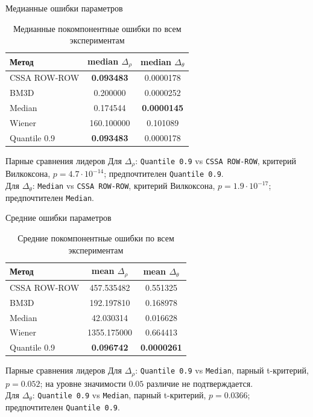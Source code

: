 \documentclass[unicode,notheorems]{beamer}
\begin{document}
\begin{frame}{Медианные ошибки параметров}
	\begin{table}[H]
		\centering
		\scriptsize
		\begin{tabular}{|l|c|c|}
			\hline
			Метод & median $\Delta_\rho$ & median $\Delta_\theta$ \\
			\hline
			CSSA ROW-ROW & \textbf{0.093483} & 0.0000178 \\
			BM3D & 0.200000 & 0.0000252 \\
			Median & 0.174544 & \textbf{0.0000145} \\
			Wiener & 160.100000 & 0.101089 \\
			Quantile 0.9 & \textbf{0.093483} & 0.0000178 \\
			\hline
		\end{tabular}
		\caption{Медианные покомпонентные ошибки по всем экспериментам}
	\end{table}

	\begin{block}{Парные сравнения лидеров}
		\scriptsize
		Для $\Delta_\rho$: \texttt{Quantile 0.9} vs \texttt{CSSA ROW-ROW}, критерий Вилкоксона,
		$p=4.7\cdot 10^{-14}$; предпочтителен \texttt{Quantile 0.9}.\\
		Для $\Delta_\theta$: \texttt{Median} vs \texttt{CSSA ROW-ROW}, критерий Вилкоксона,
		$p=1.9\cdot 10^{-17}$; предпочтителен \texttt{Median}.
	\end{block}
\end{frame}

\begin{frame}{Средние ошибки параметров}
	\begin{table}[H]
		\centering
		\scriptsize
		\begin{tabular}{|l|c|c|}
			\hline
			Метод & mean $\Delta_\rho$ & mean $\Delta_\theta$ \\
			\hline
			CSSA ROW-ROW & 457.535482 & 0.551325 \\
			BM3D & 192.197810 & 0.168978 \\
			Median & 42.030314 & 0.016628 \\
			Wiener & 1355.175000 & 0.664413 \\
			Quantile 0.9 & \textbf{0.096742} & \textbf{0.0000261} \\
			\hline
		\end{tabular}
		\caption{Средние покомпонентные ошибки по всем экспериментам}
	\end{table}

	\begin{block}{Парные сравнения лидеров}
		\scriptsize
		Для $\Delta_\rho$: \texttt{Quantile 0.9} vs \texttt{Median}, парный t-критерий,
		$p=0.052$; на уровне значимости $0.05$ различие не подтверждается.\\
		Для $\Delta_\theta$: \texttt{Quantile 0.9} vs \texttt{Median}, парный t-критерий,
		$p=0.0366$; предпочтителен \texttt{Quantile 0.9}.
	\end{block}
\end{frame}
\end{document}
